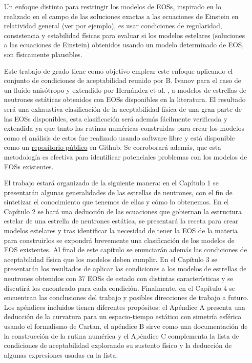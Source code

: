 Un enfoque distinto para restringir los modelos de EOSs, inspirado en lo realizado en el campo de las soluciones exactas a las ecuaciones de Einstein en relatividad general (ver \cite{Delgaty1998} por ejemplo), es usar condiciones de regularidad, consistencia y estabilidad físicas para evaluar si los modelos estelares (soluciones a las ecuaciones de Einstein) obtenidos usando un modelo determinado de EOS, son físicamente plausibles. 

Este trabajo de grado tiene como objetivo emplear este enfoque aplicando el conjunto de condiciones de aceptabilidad reunido por B. Ivanov \cite{Ivanov2017} para el caso de un fluido anisótropo y extendido por Hernández et al. \cite{Hernandez2018}, a modelos de estrellas de neutrones estáticas obtenidos con EOSs disponibles en la literatura. El resultado será una exhaustiva clasificación de la aceptabilidad física de una gran parte de las EOSs disponibles, esta clasificación será además fácilmente verificada y extendida ya que tanto las rutinas numéricas construidas para crear los modelos como el análisis de estos fue realizado usando software libre y está disponible como un \href{https://github.com/DavidRamosSal/stellar_structure}{repositorio público} en Github. Se corroborará además, que esta metodología es efectiva para identificar potenciales problemas con los modelos de EOSs existentes.

El trabajo estará organizado de la siguiente manera: en el Capítulo 1 se presentarán algunas generalidades de las estrellas de neutrones, con el fin de sintetizar el conocimiento que tenemos de ellas y cómo lo obtenemos. En el Capítulo 2 se hará una deducción de las ecuaciones que gobiernan la estructura estelar de una estrella de neutrones estática, se presentará la receta para crear modelos estelares y tras identificar la necesidad de tener la EOS de la materia para construirlos se expondrá brevemente una clasificación de los modelos de EOS existentes. Al final de este capítulo se enunciarán además las condiciones de aceptabilidad física que los modelos deben cumplir. En el Capítulo 3 se presentarán los resultados de aplicar las condiciones a los modelos de estrellas de neutrones obtenidos con 37 EOSs de estado con distintas características y se discutirá los encontrado para cada condición. Finalmente, en el Capítulo 4 se encuentran las conclusiones del trabajo y posibles direcciones de trabajo a futuro. Los apéndices incluidos tienen diferentes propósitos: el Apéndice A presenta una deducción de la curvatura para un espacio-tiempo estático con simetría esférica usando el formalismo de Cartan, el apéndice B sirve como una documentación de la construcción de la rutina numérica y el Apéndice C complementa la lista de condiciones de aceptabilidad explorando su sustento físico y la deducción de algunas expresiones usadas en la lista.



